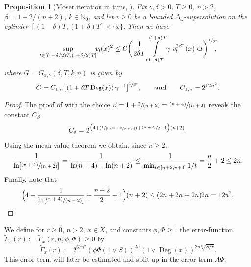 \documentclass[JEP,XML,SOM,Unicode,published]{cedram}
\newcommand{\Psfrac}[2]{(\sfrac{#1}{#2})}
\newcommand{\psfrac}[2]{\sfrac{(#1)}{#2}}
\newcommand{\spfrac}[2]{\sfrac{#1}{(#2)}}
\newcommand{\pspfrac}[2]{\sfrac{(#1)}{(#2)}}
\theoremstyle{plain}
\newtheorem{proposition}[theorem]{Proposition}
\theoremstyle{definition}
\newcommand{\NN}{\mathbb{N}}
\newcommand{\drm}{\mathrm{d}}
\DeclareMathOperator{\Deg}{Deg}
\let\oldint\int
\renewcommand{\int}{\oldint\limits}
\begin{document}
\begin{proposition}[Moser iteration in time, ]\label{thm:constantballsdavies}
Fix $\gamma,\delta>0$, $T\geq 0$, $n>2$, $\beta=1+2/(n+2)$, $k\in\NN_0$, and let $v\geq 0$ be a bounded $\Delta_\omega$-supersolution on the cylinder $[(1-\delta)T,(1+\delta)T]\times \{x\}$.
Then we have
\begin{align*}
\sup_{t\in[(1-\delta/2)T,(1+\delta/2)T]}\!\! v_t(x)^2 \leq G \biggl(\frac{1}{2\delta T}\int\limits_{(1-\delta)T}^{(1+\delta)T}
\gamma\ v_t^{2\beta^k}(x)\ \drm t\biggr)^{\sfrac{1}{\beta^k}}\!\!\!,
\end{align*}
where $G=G_{x,\gamma}(\delta,T,k,n)$ is given by
\[
G= C_{1,n}
\bigl[\left(1+\delta T\Deg(x)\right)
\gamma^{-1}\bigr]^{\sfrac{1}{\beta^{k}}},
\qquad\text{and}\qquad
C_{1,n}=2^{{12} n^2}.
\]
\end{proposition}
\begin{proof}
The proof of \cite[Th.\,3.4]{KellerRose-22a} with the choice $\beta=1+\spfrac2{n+2}=\pspfrac{n+4}{n+2}$ reveals the constant $ C_{\beta} $
\[
C_{\beta}=2^{\bigl(4+\Psfrac{1}{[\ln\pspfrac{n+4}{n+2}]}+\psfrac{n+2}{2}+1\bigr)(n+2)}.
\]
Using the mean value theorem we obtain, since $n\geq 2$,
\[
\frac{1}{\ln[\pspfrac{n+4}{n+2}]}=\frac{1}{\ln(n+4)-\ln(n+2)}\leq \frac{1}{\min_{t\in[n+2,n+4]}1/t}= {\frac{n}{2}+2}\leq {2}n.
\]
Finally, note that
\[
\Bigl(4+\frac{1}{\ln[\pspfrac{n+4}{n+2}]}+\frac{n+2}{2}+1\Bigr)(n+2)
\leq (2n+ {2}n+2n)2n = {12}n^2.\qedhere
\]
\end{proof}

We define for $r\geq0$, $n>2$, $x\in X$, and constants $\phi,\Phi\geq 1$ the error-function $\tilde\Gamma_x(r)
:=
\tilde\Gamma_x(r,n,\phi,\Phi)\geq 0$ by
\[
\tilde\Gamma_x(r)
:=
2^{67n^2}(\phi \Phi(1\vee S))^{2n}
\left(1\vee\Deg(x)
\right)
^{2n\sqrt[n]{{S}/{r}}}.
\]
This error term will later be estimated and split up in the error term $ A\Psi $.
\end{document}
